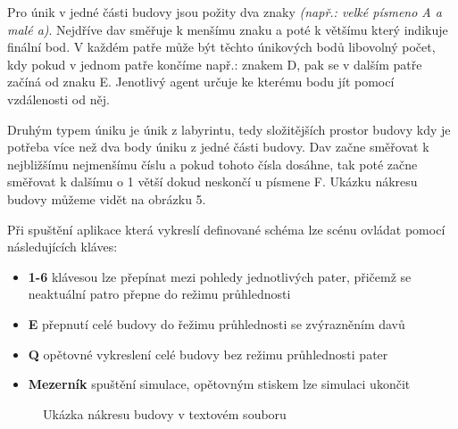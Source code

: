 \documentclass[czech,public,dept460,male,cpdeclaration]{diploma}
\begin{document}
Pro únik v jedné části budovy jsou požity dva znaky \textit{(např.: velké  písmeno A a malé a)}. Nejdříve dav směřuje k menšímu znaku a poté k většímu který indikuje finální bod. V každém patře může být těchto únikových bodů libovolný počet, kdy pokud v jednom patře končíme např.: znakem D, pak se v dalším patře začíná od znaku E. Jenotlivý agent určuje ke kterému bodu jít pomocí vzdálenosti od něj.

Druhým typem úniku je únik z labyrintu, tedy složitějších prostor budovy kdy je potřeba více než dva body úniku z jedné části budovy. Dav začne směřovat k nejbližšímu nejmenšímu číslu a pokud tohoto čísla dosáhne, tak poté začne směřovat k dalšímu o 1 větší dokud neskončí u písmene F. Ukázku nákresu budovy můžeme vidět na obrázku 5.

Při spuštění aplikace která vykreslí definované schéma lze scénu ovládat pomocí následujících kláves:

\begin{itemize}
	\item \textbf{1-6} klávesou lze přepínat mezi pohledy jednotlivých pater, přičemž se neaktuální patro přepne do režimu průhlednosti
	\item \textbf{E} přepnutí celé budovy do řežimu průhlednosti se zvýrazněním davů
	\item \textbf{Q} opětovné vykreslení celé budovy bez režimu průhlednosti pater
	\item \textbf{Mezerník} spuštění simulace, opětovným stiskem lze simulaci ukončit
\end{itemize}

\begin{figure}[H]
	\centering
	\hfill
	\caption{Ukázka nákresu budovy v textovém souboru}
\end{figure}
\end{document}
